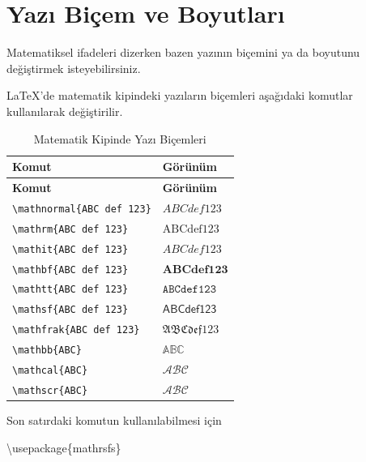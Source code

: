 \documentclass[
  10pt,
]{scrbook}
\newenvironment{Shaded}{}{}
\newcommand{\BuiltInTok}[1]{#1}
\newcommand{\ExtensionTok}[1]{#1}
\newcommand{\NormalTok}[1]{#1}
\theoremstyle{definition}
\theoremstyle{definition}
\theoremstyle{definition}
\theoremstyle{definition}
\theoremstyle{remark}
\begin{document}
\hypertarget{yazux131-biuxe7em-ve-boyutlarux131}{%
\section{Yazı Biçem ve Boyutları}\label{yazux131-biuxe7em-ve-boyutlarux131}}

Matematiksel ifadeleri dizerken bazen yazının biçemini ya da boyutunu değiştirmek isteyebilirsiniz.

LaTeX'de matematik kipindeki yazıların biçemleri aşağıdaki komutlar kullanılarak değiştirilir.

\begin{longtable}[]{@{}ll@{}}
\caption{\label{tab:matyazi} Matematik Kipinde Yazı Biçemleri}\tabularnewline
\toprule
\textbf{Komut} & \textbf{Görünüm} \\
\midrule
\endfirsthead
\toprule
\textbf{Komut} & \textbf{Görünüm} \\
\midrule
\endhead
\texttt{\textbackslash{}mathnormal\{ABC\ def\ 123\}} & \(ABC def 123\) \\
\texttt{\textbackslash{}mathrm\{ABC\ def\ 123\}} & \(\mathrm{ABC def 123}\) \\
\texttt{\textbackslash{}mathit\{ABC\ def\ 123\}} & \(\mathit{ABC def 123}\) \\
\texttt{\textbackslash{}mathbf\{ABC\ def\ 123\}} & \(\mathbf{ABC def 123}\) \\
\texttt{\textbackslash{}mathtt\{ABC\ def\ 123\}} & \(\mathtt{ABC def 123}\) \\
\texttt{\textbackslash{}mathsf\{ABC\ def\ 123\}} & \(\mathsf{ABC def 123}\) \\
\texttt{\textbackslash{}mathfrak\{ABC\ def\ 123\}} & \(\mathfrak{ABC def 123}\) \\
\texttt{\textbackslash{}mathbb\{ABC\}} & \(\mathbb{ABC}\) \\
\texttt{\textbackslash{}mathcal\{ABC\}} & \(\mathcal{ABC}\) \\
\texttt{\textbackslash{}mathscr\{ABC\}} & \(\mathscr{ABC}\) \\
\bottomrule
\end{longtable}

Son satırdaki komutun kullanılabilmesi için

\begin{Shaded}
\begin{Highlighting}[]
\BuiltInTok{\textbackslash{}usepackage}\NormalTok{\{}\ExtensionTok{mathrsfs}\NormalTok{\}}
\end{Highlighting}
\end{Shaded}
\end{document}
